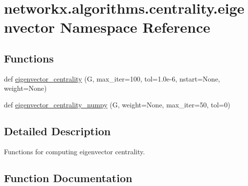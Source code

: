 \hypertarget{namespacenetworkx_1_1algorithms_1_1centrality_1_1eigenvector}{}\section{networkx.\+algorithms.\+centrality.\+eigenvector Namespace Reference}
\label{namespacenetworkx_1_1algorithms_1_1centrality_1_1eigenvector}
\subsection*{Functions}
\begin{DoxyCompactItemize}
\item 
def \hyperlink{namespacenetworkx_1_1algorithms_1_1centrality_1_1eigenvector_a88c4515d87aa014a07b890e40bb275c0}{eigenvector\+\_\+centrality} (G, max\+\_\+iter=100, tol=1.\+0e-\/6, nstart=\+None, weight=\+None)
\item 
def \hyperlink{namespacenetworkx_1_1algorithms_1_1centrality_1_1eigenvector_a0b606aaa87fdae028b1a626b6348aa72}{eigenvector\+\_\+centrality\+\_\+numpy} (G, weight=None, max\+\_\+iter=50, tol=0)
\end{DoxyCompactItemize}


\subsection{Detailed Description}
\begin{DoxyVerb}Functions for computing eigenvector centrality.\end{DoxyVerb}
 

\subsection{Function Documentation}
\mbox{\label{namespacenetworkx_1_1algorithms_1_1centrality_1_1eigenvector_a88c4515d87aa014a07b890e40bb275c0}} 
